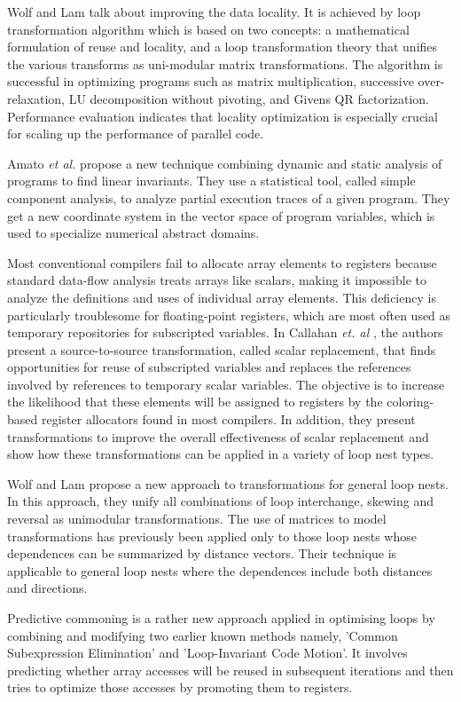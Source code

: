 Wolf and Lam \cite{wolf1991data} talk about improving the data locality. It is achieved by loop transformation algorithm which is based on two concepts: a mathematical formulation of reuse and locality, and a loop transformation theory that unifies the various transforms as uni-modular matrix transformations. The algorithm is successful in optimizing programs such as matrix multiplication, successive over-relaxation, LU decomposition without pivoting, and Givens QR factorization. Performance evaluation indicates that locality optimization is especially crucial for scaling up the performance of parallel code.


Amato \textsl{et al.} \cite{amato2012discovering} propose a new technique combining dynamic and static analysis of programs to find linear invariants. They use a statistical tool, called simple component analysis, to analyze partial execution traces of a given program. They get a new coordinate system in the vector space of program variables, which is used to specialize numerical abstract domains.

Most conventional compilers fail to allocate array elements to registers because standard data-flow analysis treats arrays like scalars, making it impossible to analyze the definitions and uses of individual array elements. This deficiency is particularly troublesome for floating-point registers, which are most often used as temporary repositories for subscripted variables. In Callahan \textsl{et. al} \cite{callahan1990improving}, the authors present a source-to-source transformation, called scalar replacement, that finds opportunities for reuse of subscripted variables and replaces the references involved by references to temporary scalar variables. The objective is to increase the likelihood that these elements will be assigned to registers by the coloring-based register allocators found in most compilers. In addition, they present transformations to improve the overall effectiveness of scalar replacement and show how these transformations can be applied in a variety of loop nest types.

Wolf and Lam \cite{wolf1991loop} propose a new approach to transformations for general loop nests. In this approach, they unify all combinations of loop interchange, skewing and reversal as unimodular transformations. The use of matrices to model transformations has previously been applied only to those loop nests whose dependences can be summarized by distance vectors. Their technique is applicable to general loop nests where the dependences include both distances and directions.

Predictive commoning is a rather new approach applied in optimising loops by combining and modifying two earlier known methods namely, ’Common Subexpression Elimination’ and ’Loop-Invariant Code Motion’. It involves predicting whether array accesses will be reused in subsequent iterations and then tries to optimize those accesses by promoting them to registers.